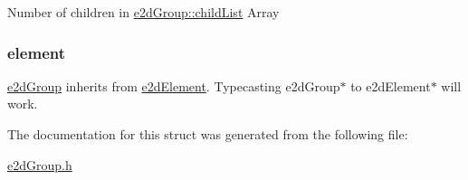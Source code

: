 Number of children in \hyperlink{structe2dGroup_a55f6dde874716dc99dcd270fc0999a01}{e2d\-Group\-::child\-List} Array \hypertarget{structe2dGroup_a55bc7a3a0af41fba9e5b91f390c5928c}{
\subsubsection[{element}]{ {\bf element}}}\label{structe2dGroup_a55bc7a3a0af41fba9e5b91f390c5928c}
\hyperlink{structe2dGroup}{e2d\-Group} inherits from \hyperlink{structe2dElement}{e2d\-Element}. Typecasting e2d\-Group$\ast$ to e2d\-Element$\ast$ will work. 

The documentation for this struct was generated from the following file\-:\begin{DoxyCompactItemize}
\item 
\hyperlink{e2dGroup_8h}{e2d\-Group.\-h}\end{DoxyCompactItemize}
